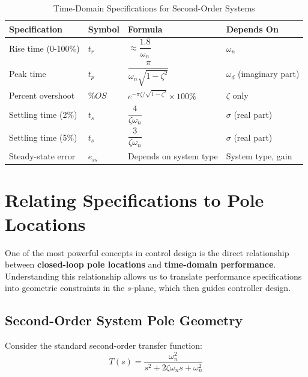\begin{table}[htbp]
\centering
\caption{Time-Domain Specifications for Second-Order Systems}
\label{tab:time_domain_specs}
\begin{tabular}{llll}
\toprule
\textbf{Specification} & \textbf{Symbol} & \textbf{Formula} & \textbf{Depends On} \\
\midrule
Rise time (0-100\%) & $t_r$ & $\approx \dfrac{1.8}{\omega_n}$ & $\omega_n$ \\[1em]
Peak time & $t_p$ & $\dfrac{\pi}{\omega_n\sqrt{1-\zeta^2}}$ & $\omega_d$ (imaginary part) \\[1em]
Percent overshoot & $\%OS$ & $e^{-\pi\zeta/\sqrt{1-\zeta^2}} \times 100\%$ & $\zeta$ only \\[1em]
Settling time (2\%) & $t_s$ & $\dfrac{4}{\zeta\omega_n}$ & $\sigma$ (real part) \\[1em]
Settling time (5\%) & $t_s$ & $\dfrac{3}{\zeta\omega_n}$ & $\sigma$ (real part) \\[1em]
Steady-state error & $e_{ss}$ & Depends on system type & System type, gain \\
\bottomrule
\end{tabular}
\end{table}


\section{Relating Specifications to Pole Locations}
\label{sec:pole_locations}

One of the most powerful concepts in control design is the direct relationship between \textbf{closed-loop pole locations} and \textbf{time-domain performance}. Understanding this relationship allows us to translate performance specifications into geometric constraints in the $s$-plane, which then guides controller design.

\subsection{Second-Order System Pole Geometry}

Consider the standard second-order transfer function:
\begin{equation}
    T(s) = \frac{\omega_n^2}{s^2 + 2\zeta\omega_n s + \omega_n^2}
\end{equation}

